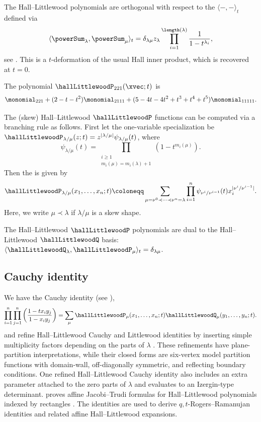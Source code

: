 The Hall--Littlewood polynomials are orthogonal with respect to the
\label{hallLittlewoodInnerProduct}
$\langle - , - \rangle_t$
defined via
\[
\langle \powerSum_\lambda , \powerSum_\mu \rangle_t
=
\delta_{\lambda\mu} z_{\lambda} \prod_{i=1}^{\length(\lambda)}
\frac{1}{1-t^{\lambda_i} },
\]
see \cite[III, \S4]{Macdonald1995}.  This is a $t$-deformation of the usual
Hall inner product,
which is recovered at $t=0$.


\begin{example*}
The polynomial $\hallLittlewoodP_{221}(\xvec;t)$ is
\[
\monomial_{221}
+ (2-t-t^2)\monomial_{2111}
+ (5-4 t-4 t^2+t^3+t^4+t^5)\monomial_{11111}.
\]
\end{example*}


The (skew) Hall--Littlewood $\hallLittlewoodP$ functions can be computed via a
branching rule as follows.
First let the one-variable specialization be
$\hallLittlewoodP_{\lambda/\mu}(z;t)
= z^{|\lambda/\mu|}\psi_{\lambda/\mu}(t)$,
where
\[
\psi_{\lambda/\mu}(t)
=
\prod_{\substack{ i \geq 1 \\ m_i(\mu) = m_i(\lambda)+1 }}
\left( 1-t^{m_i(\mu)} \right).
\]
Then the \label{skewHallLittlewoodP}
is given by
\[
\hallLittlewoodP_{\lambda/\mu}(x_1,\dotsc,x_n;t)
\coloneqq
\sum_{ \mu = \nu^{0} \prec \dotsb \prec \nu^n = \lambda}
\prod_{i=1}^n \psi_{\nu^{i}/\nu^{i-1}}(t) x_i^{|\nu^{i}/\nu^{i-1}|}.
\]
Here, we write $\mu \prec \lambda$ if $\lambda/\mu$ is a skew shape.

The Hall--Littlewood $\hallLittlewoodP$ polynomials are dual to the
Hall--Littlewood $\hallLittlewoodQ$ basis:
$\langle \hallLittlewoodQ_\lambda, \hallLittlewoodP_\mu \rangle_t
= \delta_{\lambda\mu}$.


\subsection[hallLittlewoodCauchy]{Cauchy identity}

We have the Cauchy identity (see \cite[Ch.~III, Eq.~(4.4)]{Macdonald1995}),
\[
\prod_{i=1}^n \prod_{j=1}^n \left( \frac{1-tx_i y_j}{1-x_iy_j } \right) =
\sum_{\mu} \hallLittlewoodP_\mu(x_1,\dotsc,x_n;t) \hallLittlewoodQ_\mu(y_1,\dotsc,y_n;t).
\]
 and  refine Hall--Littlewood Cauchy
and Littlewood identities by inserting simple multiplicity factors depending
on the parts of $\lambda$ \cite{BeteaWheeler2016}.  These refinements have
plane-partition interpretations, while their closed forms are six-vertex
model partition functions with domain-wall, off-diagonally symmetric, and
reflecting boundary conditions.  One refined Hall--Littlewood Cauchy identity
also includes an extra parameter attached to the zero parts of $\lambda$ and
evaluates to an Izergin-type determinant.
 proves affine Jacobi--Trudi formulas
for Hall--Littlewood polynomials indexed by rectangles
\cite{Warnaar2025x}.  The identities are used to derive $q,t$-Rogers--Ramanujan
identities and related affine Hall--Littlewood expansions.

